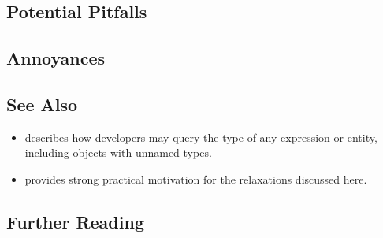\subsection[Potential Pitfalls]{Potential Pitfalls}\label{potential-pitfalls}

\hspace{\fill}

\subsection[Annoyances]{Annoyances}\label{annoyances}

\hspace{\fill}

\subsection[See Also]{See Also}\label{see-also}

\begin{itemize}
\item{describes how developers may query the type of any expression or entity, including objects with unnamed types.}
\item{provides strong practical motivation for the relaxations discussed here.}
\end{itemize}

\subsection[Further Reading]{Further Reading}\label{further-reading}

\hspace{\fill}



